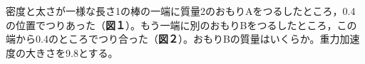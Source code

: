 \item
    \begin{mawarikomi}{150pt}{}
    密度と太さが一様な長さ1の棒の一端に質量2のおもりAをつるしたところ，0.4の位置でつりあった（{\bf 図１}）。もう一端に別のおもりBをつるしたところ，この端から0.4のところでつり合った（{\bf 図２}）。おもりBの質量はいくらか。重力加速度の大きさを9.8とする。
    \end{mawarikomi}